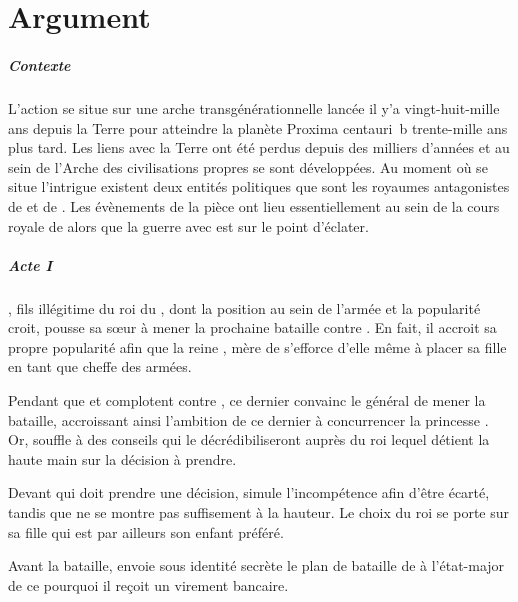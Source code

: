 \chapter{Argument}
  \makeatletter
  \pagestyle{fancy2}
  \fancyhead[LE,RO]{\thepage}
  \fancyfoot{}

  \makeatother

\paragraph{Contexte}
L’action se situe sur une arche transgénérationnelle lancée il y’a vingt-huit-mille ans depuis la Terre pour atteindre la planète Proxima centauri~b trente-mille ans plus tard. Les liens avec la Terre ont été perdus depuis des milliers d’années et au sein de l’Arche des civilisations propres se sont développées. Au moment où se situe l’intrigue existent deux entités politiques que sont les royaumes antagonistes de \campprincipal{} et de \campoppose{}.
Les évènements de la pièce ont lieu essentiellement au sein de la cours royale de \campprincipal{} alors que la guerre avec \campoppose{} est sur le point d’éclater.

\paragraph{Acte I}
\elena{}, fils illégitime du roi du \campprincipal, dont la position au sein de l’armée et la popularité croit, pousse sa sœur \princesse{} à mener la prochaine bataille contre \campoppose{}. En fait, il accroit sa propre popularité afin que la reine \reine{}, mère de \princesse{}  s’efforce d’elle même à placer sa fille en tant que cheffe des armées.

Pendant que \reine{} et \princesse{} complotent contre \elena{},
ce dernier convainc le général \general{} de mener la bataille, accroissant ainsi l’ambition de ce dernier à concurrencer la princesse \princesse{}. Or, \elena{} souffle à \general{} des conseils qui le décrédibiliseront auprès du roi \roi{} lequel détient la haute main sur la décision à prendre.

Devant \roi{} qui doit prendre une décision, \elena{} simule l’incompétence afin d’être écarté, tandis que \general{} ne se montre pas suffisement à la hauteur. Le choix du roi se porte sur sa fille \princesse{} qui est par ailleurs son enfant préféré.

Avant la bataille, \elena{} envoie sous identité secrète le plan de bataille de \princesse{} à l’état-major de \campoppose{} ce pourquoi il reçoit un virement bancaire.


